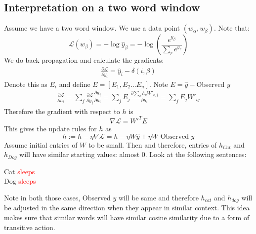 \subsection{Interpretation on a two word window}
Assume we have a two word window. We use a data point $(w_\alpha,w_\beta)$. Note that:
$$\mathcal{L}(w_\beta)=-\log \hat y_\beta=-\log\left(\frac{e^{y_\beta}}{\sum_{r} e^{y_r}}\right)$$
We do back propagation and calculate the gradients:
\begin{align*}
    \frac{\partial \mathcal L}{\partial y_i}=\hat y_i-\delta(i,\beta)
\end{align*}
Denote this as $E_i$ and define $E=[E_1, E_2\hdots E_n]$. Note $E=\hat y-$Observed $y$
\begin{align*}
    \frac{\partial \mathcal L}{\partial h_i}=\sum_{j}\frac{\partial \mathcal L}{\partial y_j}\frac{\partial y_j}{\partial h_i}= \sum_j E_j\frac{\partial \sum_k h_k W'_{k,j}}{\partial h_i}=\sum_j E_jW'_{ij}
\end{align*}
Therefore the gradient with respect to $h$ is
$$\nabla \mathcal L=W'^TE$$
This gives the update rules for $h$ as 
$$h:=h-\eta\nabla \mathcal L=h- \eta W\hat y+\eta W\text{ Observed }y$$
Assume  initial entries of $W$ to be small. Then and therefore, entries of $h_{Cat}$ and $h_{Dog}$ will have similar starting values: almost 0. Look at the following sentences:
\begin{center}
    Cat \textcolor{red}{sleeps}\\
    Dog \textcolor{red}{sleeps}
\end{center}
Note in both those cases, Observed $y$ will be same and therefore $h_{cat}$ and $h_{dog}$ will be adjusted in the same direction when they appear in similar context. This idea makes sure that similar words will have similar cosine similarity due to a form of transitive action. 

